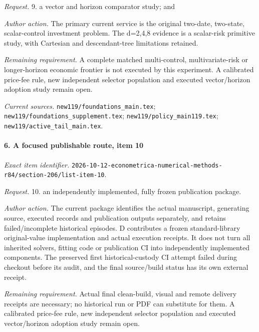 \par\emph{Request.} 9. a vector and horizon comparator study; and

\par\emph{Author action.} The primary current service is the original two-date, two-state, scalar-control investment problem. The d=2,4,8 evidence is a scalar-risk primitive study, with Cartesian and descendant-tree limitations retained.

\par\emph{Remaining requirement.} A complete matched multi-control, multivariate-risk or longer-horizon economic frontier is not executed by this experiment. A calibrated price-fee rule, new independent selector population and executed vector/\allowbreak{}horizon adoption study remain open.

\par\emph{Current sources.} \nolinkurl{new119/foundations_main.tex}; \nolinkurl{new119/foundations_supplement.tex}; \nolinkurl{new119/policy_main119.tex}; \nolinkurl{new119/active_tail_main.tex}.

\paragraph{6. A focused publishable route, item 10}

\emph{Exact item identifier.} \nolinkurl{2026-10-12-econometrica-numerical-methods-r84/section-206/list-item-10}.

\par\emph{Request.} 10. an independently implemented, fully frozen publication package.

\par\emph{Author action.} The current package identifies the actual manuscript, generating source, executed records and publication outputs separately, and retains failed/\allowbreak{}incomplete historical episodes. D contributes a frozen standard-library original-value implementation and actual execution receipts. It does not turn all inherited solvers, fitting code or publication CI into independently implemented components. The preserved first historical-custody CI attempt failed during checkout before its audit, and the final source/\allowbreak{}build status has its own external receipt.

\par\emph{Remaining requirement.} Actual final clean-build, visual and remote delivery receipts are necessary; no historical run or PDF can substitute for them. A calibrated price-fee rule, new independent selector population and executed vector/\allowbreak{}horizon adoption study remain open.

